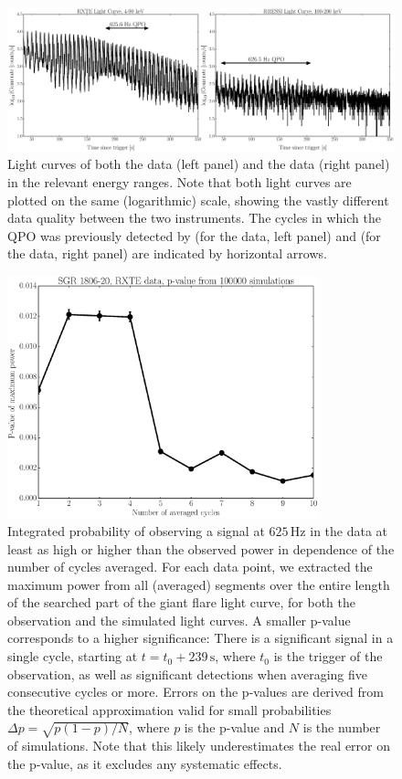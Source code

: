 \documentclass{emulateapj}
\begin{document}
\begin{figure}[htbp]
\begin{center}
\includegraphics[width=18cm]{f1.eps}
\caption{Light curves of both the \rxte data (left panel) and the \rhessi data (right panel) in the relevant energy ranges. Note that both light curves are plotted on the same (logarithmic) scale, showing the vastly different data quality between the two instruments. 
The cycles in which the QPO was previously detected by \citet{Strohmayer06} (for the \rxte data, left panel) and \citet{Watts06} (for the \rhessi data, right panel) are indicated by horizontal arrows.}
\label{fig:lcs}
\end{center}
\end{figure}

\begin{figure}[htbp]
\begin{center}
\includegraphics[width=9cm]{f2.eps}
\caption{Integrated probability of observing a signal at $625 \, \mathrm{Hz}$ in the \rxte data at least as high or higher than the observed power in dependence of the number of cycles averaged. For each data point, we extracted the maximum power from all (averaged) segments over the entire length of the searched part of the giant flare light curve, for both the observation and the simulated light curves. A smaller p-value corresponds to a higher significance: There is a significant signal in a single cycle, starting at $t = t_0 + 239 \, \mathrm{s}$, where $t_0$ is the trigger of the observation, as well as significant detections when averaging five consecutive cycles or more. Errors on the p-values are derived from the theoretical approximation valid for small probabilities $\Delta p = \sqrt{p (1-p)/N}$, where $p$ is the p-value and $N$ is the number of simulations. Note that this likely underestimates the real error on the p-value, as it excludes any systematic effects.}
\label{fig:rxte_pvals}
\end{center}
\end{figure}
\end{document}
